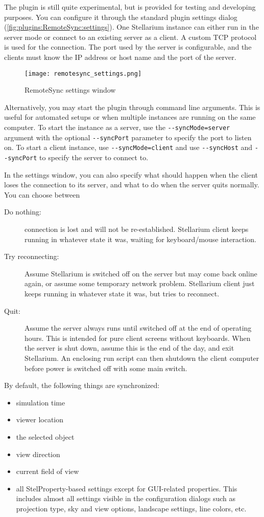 The plugin is still quite experimental, but is provided for testing and developing purposes.
You can configure it through the standard plugin settings dialog 
(\autoref{fig:plugins:RemoteSync:settings}). One Stellarium instance
can either run in the server mode or connect to an existing server as a client.
A custom TCP protocol is used for the connection. The port used by the server is
configurable, and the clients must know the IP address or host name and the port
of the server.

\begin{figure}[htb]
	\centering\texttt{[image: remotesync\_settings.png]}
	\caption{RemoteSync settings window}
	\label{fig:plugins:RemoteSync:settings}
\end{figure}

Alternatively, you may start the plugin through command line arguments. This is
useful for automated setups or when multiple instances are running on the same
computer. To start the instance as a server, use the
\texttt{-{}-syncMode=server} argument with the optional \texttt{-{}-syncPort}
parameter to specify the port to listen on. To start a client instance, use
\texttt{-{}-syncMode=client} and use \texttt{-{}-syncHost} and
\texttt{-{}-syncPort} to specify the server to connect to.

In the settings window, you can also specify what should happen when the client 
loses the connection to its server, and what to do when the server quits 
normally. You can choose between 
\begin{description}
\item[Do nothing:] connection is lost and will not be re-established. Stellarium client keeps running 
     in whatever state it was, waiting for keyboard/mouse interaction. 
\item[Try reconnecting:] Assume Stellarium is switched off on the server
      but may come back online again, or assume some temporary network problem. 
	  Stellarium client just keeps running in whatever state it was, but tries to reconnect.
\item[Quit:] Assume the server always runs until switched off at the end of operating hours. 
      This is intended for pure client screens without keyboards. When the server  
	  is shut down, assume this is the end of the day, and exit Stellarium. An enclosing run script 
	  can then shutdown the client computer before power is switched off with some main switch. 
\end{description}
By default, the following things are synchronized:
\begin{itemize}
	\item simulation time
	\item viewer location
	\item the selected object
	\item view direction
	\item current field of view
	\item all StelProperty-based settings except for GUI-related properties. 
	This includes almost all settings visible in the configuration dialogs such 
	as projection type, sky and view options, landscape settings, line colors, etc.
\end{itemize}

